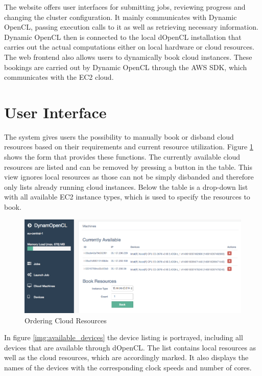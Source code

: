 The website offers user interfaces for submitting jobs, reviewing progress and changing the cluster configuration. It mainly communicates with Dynamic OpenCL, passing execution calls to it as well as retrieving necessary information. Dynamic OpenCL then is connected to the local dOpenCL installation that carries out the actual computations either on local hardware or cloud resources. The web frontend also allows users to dynamically book cloud instances. These bookings are carried out by Dynamic OpenCL through the AWS SDK, which communicates with the EC2 cloud.
\section{User Interface}

The system gives users the possibility to manually book or disband cloud resources based on their requirements and current resource utilization. Figure \ref{img:machine_order} shows the form that provides these functions. The currently available cloud resources are listed and can be removed by pressing a button in the table. This view ignores local resources as those can not be simply disbanded and therefore only lists already running cloud instances. Below the table is a drop-down list with all available EC2 instance types, which is used to specify the resources to book.

\begin{figure}[!htb]
	\includegraphics[width=1\textwidth]{screenshots/machine_order.png}
	\centering
	\caption{Ordering Cloud Resources}
	\label{img:machine_order}
\end{figure}

In figure \ref{img:available_devices} the device listing is portrayed, including all devices that are available through dOpenCL. The list contains local resources as well as the cloud resources, which are accordingly marked. It also displays the names of the devices with the corresponding clock speeds and number of cores.

